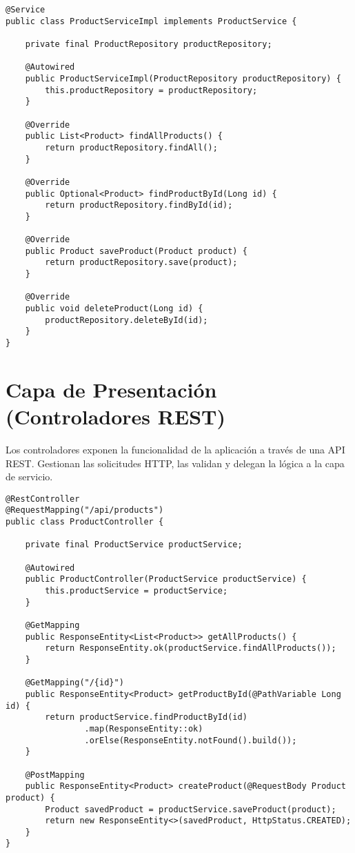 \documentclass[12pt, a4paper]{article}
\begin{document}
\begin{lstlisting}[style=javastyle, caption={Implementación `ProductServiceImpl`}, label=lst:productserviceimpl]
@Service
public class ProductServiceImpl implements ProductService {

    private final ProductRepository productRepository;

    @Autowired
    public ProductServiceImpl(ProductRepository productRepository) {
        this.productRepository = productRepository;
    }

    @Override
    public List<Product> findAllProducts() {
        return productRepository.findAll();
    }

    @Override
    public Optional<Product> findProductById(Long id) {
        return productRepository.findById(id);
    }

    @Override
    public Product saveProduct(Product product) {
        return productRepository.save(product);
    }

    @Override
    public void deleteProduct(Long id) {
        productRepository.deleteById(id);
    }
}
\end{lstlisting}

\section{Capa de Presentación (Controladores REST)}
Los controladores exponen la funcionalidad de la aplicación a través de una API REST. Gestionan las solicitudes HTTP, las validan y delegan la lógica a la capa de servicio.

\begin{lstlisting}[style=javastyle, caption={Controlador `ProductController`}, label=lst:productcontroller]
@RestController
@RequestMapping("/api/products")
public class ProductController {

    private final ProductService productService;

    @Autowired
    public ProductController(ProductService productService) {
        this.productService = productService;
    }

    @GetMapping
    public ResponseEntity<List<Product>> getAllProducts() {
        return ResponseEntity.ok(productService.findAllProducts());
    }

    @GetMapping("/{id}")
    public ResponseEntity<Product> getProductById(@PathVariable Long id) {
        return productService.findProductById(id)
                .map(ResponseEntity::ok)
                .orElse(ResponseEntity.notFound().build());
    }

    @PostMapping
    public ResponseEntity<Product> createProduct(@RequestBody Product product) {
        Product savedProduct = productService.saveProduct(product);
        return new ResponseEntity<>(savedProduct, HttpStatus.CREATED);
    }
}
\end{lstlisting}
\end{document}
